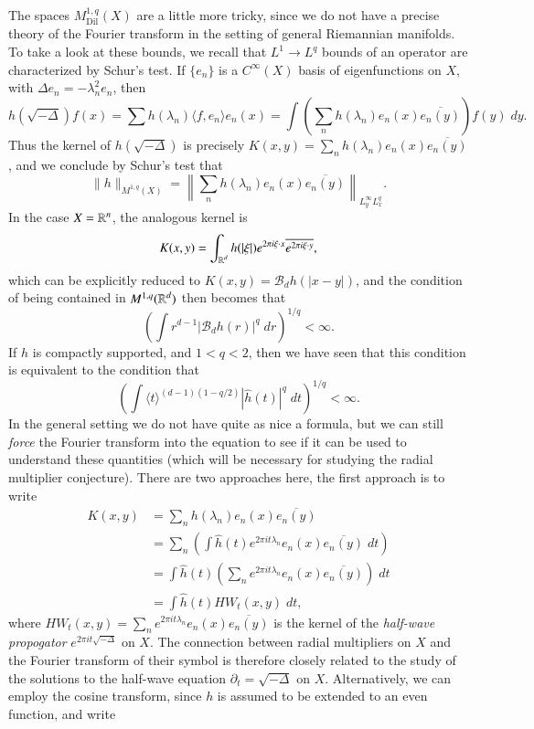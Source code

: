 The spaces $M^{1,q}_{\text{Dil}}(X)$ are a little more tricky, since we do not have a precise theory of the Fourier transform in the setting of general Riemannian manifolds. To take a look at these bounds, we recall that $L^1 \to L^q$ bounds of an operator are characterized by Schur's test. If $\{ e_n \}$ is a $C^\infty(X)$ basis of eigenfunctions on $X$, with $\Delta e_n = - \lambda_n^2 e_n$, then
%
\[ h(\sqrt{-\Delta}) f(x) = \sum h(\lambda_n) \langle f, e_n \rangle e_n(x) = \int \left( \sum_n h(\lambda_n) e_n(x) \overline{e_n(y)} \right) f(y)\; dy. \]
%
Thus the kernel of $h(\sqrt{-\Delta})$ is precisely $K(x,y) = \sum_n h(\lambda_n) e_n(x) \overline{e_n(y)}$, and we conclude by Schur's test that
%
\[ \| h \|_{M^{1,q}(X)} = \left\| \sum_n h(\lambda_n) e_n(x) \overline{e_n(y)} \right\|_{L^\infty_y L^q_x}. \]
%
In the case $X = \operatorname{\mathbb{R}}^n$, the analogous kernel is
%
\[ K(x,y) = \int_{\operatorname{\mathbb{R}}^d} h(|\xi|) e^{2 \pi i \xi \cdot x} \overline{e^{2 \pi i \xi \cdot y}}, \]
%
which can be explicitly reduced to $K(x,y) = \mathcal{B}_d h(|x - y|)$, and the condition of being contained in $M^{1,q}(\operatorname{\mathbb{R}}^d)$ then becomes that
%
\[ \left( \int r^{d-1} |\mathcal{B}_d h(r)|^q\; dr \right)^{1/q} < \infty. \]
%
If $h$ is compactly supported, and $1 < q < 2$, then we have seen that this condition is equivalent to the condition that
%
\[ \left( \int \langle t \rangle^{(d-1)(1 - q/2)} |\widehat{h}(t)|^q\; dt \right)^{1/q} < \infty. \]
%
In the general setting we do not have quite as nice a formula, but we can still \emph{force} the Fourier transform into the equation to see if it can be used to understand these quantities (which will be necessary for studying the radial multiplier conjecture). There are two approaches here, the first approach is to write
%
\begin{align*}
    K(x,y) &= \sum_n h(\lambda_n) e_n(x) \overline{e_n(y)}\\
    &= \sum_n \left( \int \widehat{h}(t) e^{2 \pi i t \lambda_n} e_n(x) \overline{e_n(y)}\; dt \right) \\
    &= \int \widehat{h}(t) \left( \sum_n e^{2 \pi i t \lambda_n} e_n(x) \overline{e_n(y)} \right)\; dt\\
    &= \int \widehat{h}(t) HW_t(x,y)\; dt,
\end{align*}
%
where $HW_t(x,y) = \sum_n e^{2 \pi i t \lambda_n} e_n(x) \overline{e_n(y)}$ is the kernel of the \emph{half-wave propogator} $e^{2 \pi i t \sqrt{-\Delta}}$ on $X$. The connection between radial multipliers on $X$ and the Fourier transform of their symbol is therefore closely related to the study of the solutions to the half-wave equation $\partial_t = \sqrt{-\Delta}$ on $X$. Alternatively, we can employ the cosine transform, since $h$ is assumed to be extended to an even function, and write
